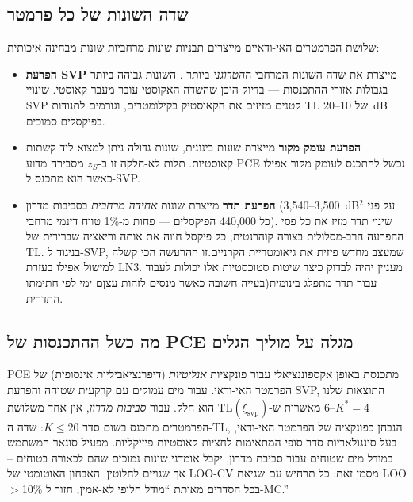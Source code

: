 \documentclass[12pt,a4paper]{article}
\begin{document}

\subsection{שדה השונות של כל פרמטר}
\label{sec:variance_fingerprint}

שלושת הפרמטרים האי-ודאיים מייצרים תבניות שונות מרחביות שונות מבחינה איכותית:

\begin{itemize}
  \item \textbf{הפרעת SVP} מייצרת את שדה השונות המרחבי ה\emph{הטרוגני} ביותר .
        השונות גבוהה ביותר בגבולות אזורי ההתכנסות --- בדיוק היכן שהשדה האקוסטי עובר מעבר קאוסטי.
        שינויי SVP קטנים מזיזים את הקאוסטיק בקילומטרים, וגורמים לתנודות TL של 10--20~dB
        בפיקסלים סמוכים.
   

  \item \textbf{הפרעת עומק מקור} מייצרת שונות בינונית,
     שונות גדולה ניתן למצוא ליד קשתות קאוסטיות.
        תלות לא-חלקה זו ב-$z_S$ מסבירה מדוע \textenglish{PCE} נכשל להתכנס לעומק מקור
        אפילו כאשר הוא מתכנס ל-SVP.

  \item \textbf{הפרעת תדר} מייצרת שונות \emph{אחידה מרחבית} בסביבות מדרון
        (3{,}500--3{,}540~dB$^2$ על פני כל 440{,}000 הפיקסלים ---
        פחות מ-1\%{} טווח דינמי מרחבי).
        שינוי תדר מזיז את כל פסי ההפרעה הרב-מסלולית בצורה קוהרנטית;
        כל פיקסל חווה את אותה וריאציה שברירית של TL.
        בניגוד ל-SVP, שמעצב מחדש פיזית את גיאומטריית הקרניים.זו ההרעשה הכי קשלה למישול אפילו בעזרת LN3. מעניין יהיה לבדוק כיצד שיטות סטוכסטיות אלו יכולות לעבוד עבור תדר מתפלג בינומית(בעייה חשובה כאשר מנסים לזהות עצןם ימי לפי חתימתו התדרית.
\end{itemize}



\subsection{מה כשל ההתכנסות של PCE מגלה על מוליך הגלים}
\label{sec:pce_physics}

\textenglish{PCE} מתכנסת באופן אקספוננציאלי עבור פונקציות \emph{אנליטיות} (דיפרנציאביליות אינסופית)
של הפרמטר האי-ודאי.
עבור מים עמוקים עם קרקעית שטוחה והפרעת SVP, התוצאות שלנו $K^*=4$--6 מאשרות
ש-$\mathrm{TL}(\xi_\mathrm{svp})$ הוא חלק.
עבור \emph{סביבות מדרון}, אין אחד משלושת הפרמטרים מתכנס בשום סדר
$K\leq 20$: שדה ה-TL, הנבחן כפונקציה של הפרמטר האי-ודאי,
בעל סינגולאריות סדר סופי המתאימות לחציות קאוסטיות פיזיקליות.
מפעיל סונאר המשתמש במודל מים שטוחים עבור סביבת מדרון, יקבל אומדני שונות נמוכים שהם לכאורה בטוחים – אך שגויים לחלוטין.
האבחון האוטומטי של \textenglish{LOO-CV} מסמן זאת: כל תרחיש עם שגיאת \textenglish{LOO}
$>$10\%{} בכל הסדרים מאותת ``מודל חלופי לא-אמין; חזור ל-MC.''
\end{document}
